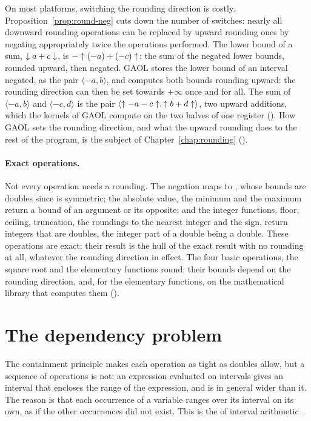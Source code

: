 \documentclass[12pt,a4paper,twoside,openright]{book}
\begin{document}
\medskip
On most platforms, switching the rounding direction is costly.
Proposition~\ref{prop:round-neg} cuts down the number of switches: nearly
all downward rounding operations can be replaced by upward rounding ones by
negating appropriately twice the operations performed. The lower bound of a
sum, $\downarrow a+c\downarrow$, is $-\uparrow(-a)+(-c)\uparrow$: the sum of the negated
lower bounds, rounded upward, then negated. GAOL stores the lower bound of
an interval negated, as the pair $\langle -a, b\rangle$, and computes both
bounds rounding upward: the rounding direction can then be set towards
$+\infty$ once and for all. The sum of $\langle -a, b\rangle$ and
$\langle -c, d\rangle$ is the pair $\langle\uparrow-a-c\uparrow,
\uparrow b+d\uparrow\rangle$, two upward additions, which the kernels of GAOL
compute on the two halves of one register (). How GAOL
sets the rounding direction, and what the upward rounding does to the rest
of the program, is the subject of Chapter~\ref{chap:rounding}
().
%

\paragraph{Exact operations.} Not every operation needs a rounding. The
negation maps  to , whose bounds are doubles since
\FSet{} is symmetric; the absolute value, the minimum and the maximum return
a bound of an argument or its opposite; and the integer functions, floor,
ceiling, truncation, the roundings to the nearest integer and the sign,
return integers that are doubles, the integer part of a double being a
double. These operations are exact: their result is the hull of the exact
result with no rounding at all, whatever the rounding direction in effect.
The four basic operations, the square root and the elementary functions
round: their bounds depend on the rounding direction, and, for the
elementary functions, on the mathematical library that computes them
().
%

\section{The dependency problem}\label{sec:dependency}
%

The containment principle makes each operation as tight as doubles allow,
but a sequence of operations is not: an expression evaluated on intervals
gives an interval that encloses the range of the expression, and is in
general wider than it. The reason is that each occurrence of a variable
ranges over its interval on its own, as if the other occurrences did not
exist. This is the  of interval
arithmetic~\cite{Moore:Book1966,Neumaier:Book1990}.
\end{document}

